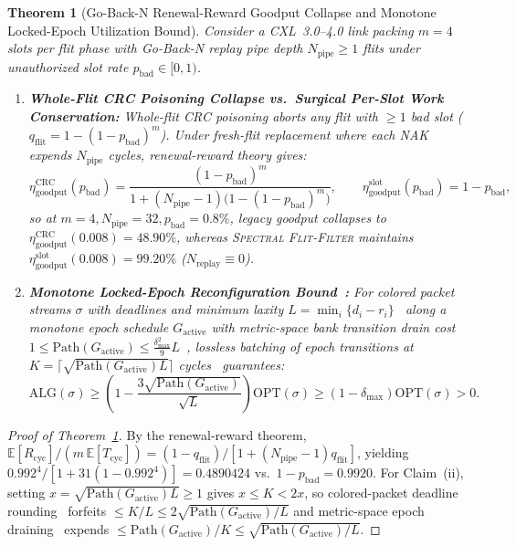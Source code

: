 \documentclass[10pt,twocolumn]{article}
\theoremstyle{spectralthm}
\newtheorem{theorem}{Theorem}[section]
\begin{document}
\begin{theorem}[Go-Back-N Renewal-Reward Goodput Collapse and Monotone Locked-Epoch Utilization Bound]
\label{thm:goodput}
Consider a \mbox{CXL~3.0--4.0} link packing $m = 4$ slots per flit phase with Go-Back-N replay pipe depth $N_{\mathrm{pipe}} \ge 1$ flits under unauthorized slot rate $p_{\mathrm{bad}} \in [0, 1)$.
\begin{enumerate}
  \item[(i)] \textbf{Whole-Flit CRC Poisoning Collapse vs.\ Surgical Per-Slot Work Conservation:} Whole-flit CRC poisoning aborts any flit with $\ge 1$ bad slot ($q_{\mathrm{flit}} = 1 - (1 - p_{\mathrm{bad}})^m$). Under fresh-flit replacement where each NAK expends $N_{\mathrm{pipe}}$ cycles, renewal-reward theory gives:
  \begin{equation}
  \label{eq:goodput}
  \eta_{\mathrm{goodput}}^{\mathrm{CRC}}(p_{\mathrm{bad}}) = \frac{(1 - p_{\mathrm{bad}})^m}{1 + (N_{\mathrm{pipe}} - 1)\bigl(1 - (1 - p_{\mathrm{bad}})^m\bigr)},\qquad
  \eta_{\mathrm{goodput}}^{\mathrm{slot}}(p_{\mathrm{bad}}) = 1 - p_{\mathrm{bad}},
  \end{equation}
  so at $m = 4, N_{\mathrm{pipe}} = 32, p_{\mathrm{bad}} = 0.8\%$, legacy goodput collapses to $\eta_{\mathrm{goodput}}^{\mathrm{CRC}}(0.008) = 48.90\%$, whereas \textsc{Spectral Flit-Filter} maintains $\eta_{\mathrm{goodput}}^{\mathrm{slot}}(0.008) = 99.20\%$ ($N_{\mathrm{replay}} \equiv 0$).
  \item[(ii)] \textbf{Monotone Locked-Epoch Reconfiguration Bound~\cite{azar2009buffer,azar2013metric,azar2026lossless}:} For colored packet streams $\sigma$ with deadlines and minimum laxity $L = \min_i\{d_i - r_i\}$~\cite{azar2009buffer} along a monotone epoch schedule $G_{\mathrm{active}}$ with metric-space bank transition drain cost $1 \le \mathrm{Path}(G_{\mathrm{active}}) \le \frac{\delta_{\max}^2}{9} L$~\cite{azar2013metric}, lossless batching of epoch transitions at $K = \lceil \sqrt{\mathrm{Path}(G_{\mathrm{active}}) L} \rceil$ cycles~\cite{azar2026lossless} guarantees:
  \begin{equation}
  \label{eq:azar_vardi}
  \mathrm{ALG}(\sigma) \ge \left(1 - \frac{3\sqrt{\mathrm{Path}(G_{\mathrm{active}})}}{\sqrt{L}}\right) \mathrm{OPT}(\sigma)
  \ge (1 - \delta_{\max})\mathrm{OPT}(\sigma) > 0.
  \end{equation}
\end{enumerate}
\end{theorem}
\begin{proof}[Proof of Theorem~\ref{thm:goodput}]
By the renewal-reward theorem, $\mathbb{E}[R_{\mathrm{cyc}}] / (m\,\mathbb{E}[T_{\mathrm{cyc}}]) = (1 - q_{\mathrm{flit}}) / [1 + (N_{\mathrm{pipe}} - 1)q_{\mathrm{flit}}]$, yielding $0.992^4 / [1 + 31(1 - 0.992^4)] = 0.4890424$ vs.\ $1 - p_{\mathrm{bad}} = 0.9920$. For Claim~(ii), setting $x = \sqrt{\mathrm{Path}(G_{\mathrm{active}}) L} \ge 1$ gives $x \le K < 2x$, so colored-packet deadline rounding~\cite{azar2009buffer} forfeits $\le K/L \le 2\sqrt{\mathrm{Path}(G_{\mathrm{active}})/L}$ and metric-space epoch draining~\cite{azar2013metric,azar2026lossless} expends $\le \mathrm{Path}(G_{\mathrm{active}})/K \le \sqrt{\mathrm{Path}(G_{\mathrm{active}})/L}$.
\end{proof}
\end{document}
